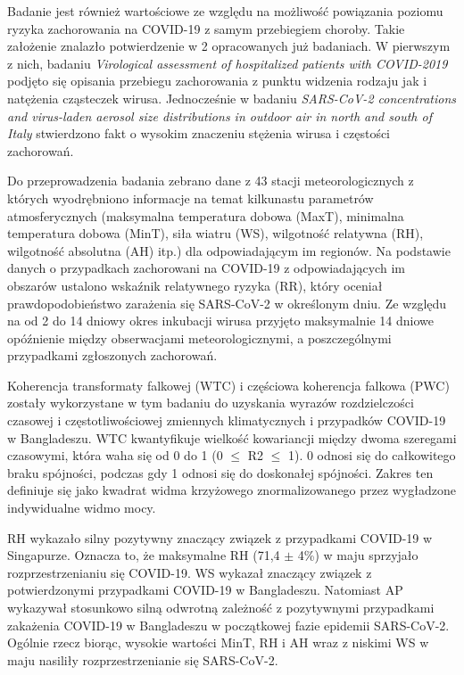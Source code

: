 \documentclass[polish, twoside, 12pt, a4paper]{article}
\theoremstyle{definition}
\theoremstyle{plain}
\theoremstyle{remark}
\begin{document}
Badanie jest również wartościowe ze względu na możliwość powiązania poziomu ryzyka zachorowania na COVID-19 z samym przebiegiem choroby. Takie założenie znalazło potwierdzenie w 2 opracowanych już badaniach. W pierwszym z nich,  badaniu \emph{Virological assessment of hospitalized patients with COVID-2019} podjęto się opisania przebiegu zachorowania z punktu widzenia rodzaju jak i natężenia cząsteczek wirusa.\cite{wolfel2020} Jednocześnie w badaniu \emph{SARS-CoV-2 concentrations and virus-laden aerosol size distributions in outdoor air in north and south of Italy} stwierdzono fakt o wysokim znaczeniu stężenia wirusa i częstości zachorowań. \cite{chirizzi2020}

Do przeprowadzenia badania zebrano dane z 43 stacji meteorologicznych z których wyodrębniono informacje na temat kilkunastu parametrów atmosferycznych (maksymalna temperatura dobowa (MaxT), minimalna temperatura dobowa (MinT), siła wiatru (WS), wilgotność relatywna (RH), wilgotność absolutna (AH) itp.) dla odpowiadającym im regionów. Na podstawie danych o przypadkach zachorowani na COVID-19 z odpowiadających im obszarów ustalono wskaźnik relatywnego ryzyka (RR), który oceniał prawdopodobieństwo zarażenia się SARS-CoV-2 w określonym dniu. Ze względu na od 2 do 14 dniowy okres inkubacji wirusa przyjęto maksymalnie 14 dniowe opóźnienie między obserwacjami meteorologicznymi, a poszczególnymi przypadkami zgłoszonych zachorowań.

Koherencja transformaty falkowej (WTC) i częściowa koherencja falkowa (PWC) zostały wykorzystane w tym badaniu do uzyskania wyrazów rozdzielczości czasowej i częstotliwościowej zmiennych klimatycznych i przypadków COVID-19 w Bangladeszu. WTC kwantyfikuje wielkość kowariancji między dwoma szeregami czasowymi, która waha się od 0 do 1 (0 $\leq$ R2 $\leq$ 1). 0 odnosi się do całkowitego braku spójności, podczas gdy 1 odnosi się do doskonałej spójności. Zakres ten definiuje się jako kwadrat widma krzyżowego znormalizowanego przez wygładzone indywidualne widmo mocy. 

RH wykazało silny pozytywny znaczący związek z przypadkami COVID-19 w Singapurze. Oznacza to, że maksymalne RH (71,4 $\pm$ 4\%) w maju sprzyjało rozprzestrzenianiu się COVID-19. WS wykazał znaczący związek z potwierdzonymi przypadkami COVID-19 w Bangladeszu. Natomiast AP wykazywał stosunkowo silną odwrotną zależność z pozytywnymi przypadkami zakażenia COVID-19 w Bangladeszu w początkowej fazie epidemii SARS-CoV-2. Ogólnie rzecz biorąc, wysokie wartości MinT, RH i AH wraz z niskimi WS w maju nasiliły rozprzestrzenianie się SARS-CoV-2.
\end{document}
